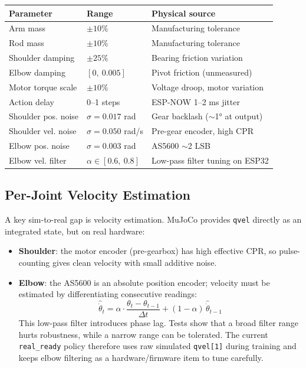 \documentclass[12pt,a4paper]{article}
\begin{document}
\begin{center}
\begin{tabular}{lll}
\toprule
\textbf{Parameter} & \textbf{Range} & \textbf{Physical source} \\
\midrule
Arm mass             & $\pm10\%$             & Manufacturing tolerance \\
Rod mass             & $\pm10\%$             & Manufacturing tolerance \\
Shoulder damping     & $\pm25\%$             & Bearing friction variation \\
Elbow damping        & $[0,\ 0.005]$         & Pivot friction (unmeasured) \\
Motor torque scale   & $\pm10\%$             & Voltage droop, motor variation \\
Action delay         & 0--1 steps            & ESP-NOW 1--2 ms jitter \\
Shoulder pos. noise  & $\sigma = 0.017$ rad  & Gear backlash ($\sim$1° at output) \\
Shoulder vel. noise  & $\sigma = 0.050$ rad/s & Pre-gear encoder, high CPR \\
Elbow pos. noise     & $\sigma = 0.003$ rad  & AS5600 $\sim$2 LSB \\
Elbow vel. filter    & $\alpha \in [0.6,\ 0.8]$ & Low-pass filter tuning on ESP32 \\
\bottomrule
\end{tabular}
\end{center}

\subsection{Per-Joint Velocity Estimation}

A key sim-to-real gap is velocity estimation. MuJoCo provides \texttt{qvel}
directly as an integrated state, but on real hardware:

\begin{itemize}
    \item \textbf{Shoulder}: the motor encoder (pre-gearbox) has high effective
          CPR, so pulse-counting gives clean velocity with small additive noise.
    \item \textbf{Elbow}: the AS5600 is an absolute position encoder; velocity
          must be estimated by differentiating consecutive readings:
          \begin{equation}
          \hat{\dot\theta}_t = \alpha \cdot \frac{\theta_t - \theta_{t-1}}{\Delta t}
          + (1 - \alpha)\,\hat{\dot\theta}_{t-1}
          \end{equation}
          This low-pass filter introduces phase lag.  Tests show that a broad
          filter range hurts robustness, while a narrow range can be tolerated.
          The current \texttt{real\_ready} policy therefore uses raw simulated
          \texttt{qvel[1]} during training and keeps elbow filtering as a
          hardware/firmware item to tune carefully.
\end{itemize}
\end{document}
